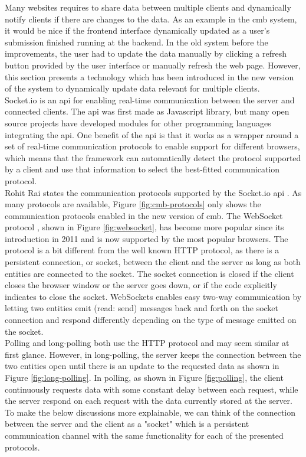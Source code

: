 Many websites requires to share data between multiple clients and dynamically notify clients if there are changes to the data. As an example in the \gls{cmb} system, it would be nice if the frontend interface dynamically updated as a user’s submission finished running at the backend. In the old system before the improvements, the user had to update the data manually by clicking a refresh button provided by the user interface or manually refresh the web page. However, this section presents a technology which has been introduced in the new version of the system to dynamically update data relevant for multiple clients. \\

Socket.io \cite{SOCKETIO} is an \gls{api} for enabling real-time communication between the server and connected clients. The \gls{api} was first made as Javascript library, but many open source projects have developed modules for other programming languages integrating the \gls{api}. One benefit of the \gls{api} is that it works as a wrapper around a set of real-time communication protocols to enable support for different browsers, which means that the framework can automatically detect the protocol supported by a client and use that information to select the best-fitted communication protocol. \\

Rohit Rai states the communication protocols supported by the Socket.io \gls{api} \cite{Rai2013}. As many protocols are available, Figure \ref{fig:cmb-protocols} only shows the communication protocols enabled in the new version of \gls{cmb}. The WebSocket protocol \cite{a:Fette2011}, shown in Figure \ref{fig:websocket}, has become more popular since its introduction in 2011 and is now supported by the most popular browsers. The protocol is a bit different from the well known HTTP protocol, as there is a persistent connection, or socket, between the client and the server as long as both entities are connected to the socket. The socket connection is closed if the client closes the browser window or the server goes down, or if the code explicitly indicates to close the socket. WebSockets enables easy two-way communication by letting two entities emit (read: send) messages back and forth on the socket connection and respond differently depending on the type of message emitted on the socket. \\

Polling and long-polling both use the HTTP protocol and may seem similar at first glance. However, in long-polling, the server keeps the connection between the two entities open until there is an update to the requested data as shown in Figure \ref{fig:long-polling}. In polling, as shown in Figure \ref{fig:polling}, the client continuously requests data with some constant delay between each request, while the server respond on each request with the data currently stored at the server. To make the below discussions more explainable, we can think of the connection between the server and the client as a "socket" which is a persistent communication channel with the same functionality for each of the presented protocols. \\


